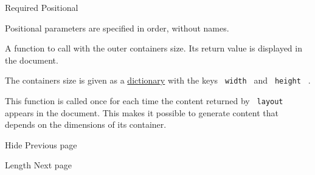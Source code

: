 {Required} {{ Positional }}

\label{parameters-func-positional-tooltip}
Positional parameters are specified in order, without names.

A function to call with the outer container\textquotesingle s size. Its
return value is displayed in the document.

The container\textquotesingle s size is given as a
\href{/docs/reference/foundations/dictionary/}{dictionary} with the keys
\texttt{\ width\ } and \texttt{\ height\ } .

This function is called once for each time the content returned by
\texttt{\ layout\ } appears in the document. This makes it possible to
generate content that depends on the dimensions of its container.

\href{/docs/reference/layout/hide/}{\pandocbounded{}}

{ Hide } { Previous page }

\href{/docs/reference/layout/length/}{\pandocbounded{}}

{ Length } { Next page }

